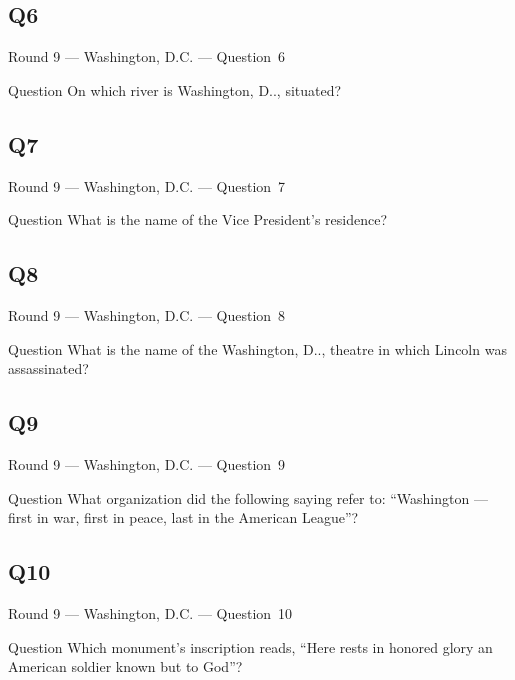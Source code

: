 \documentclass[11pt]{beamer}
\begin{document}
\subsection*{Q6}
\begin{frame}[t]{Round 9 --- Washington, D.C. --- \mbox{Question 6}}
\vspace{-0.5em}
\begin{block}{Question}
On which river is Washington, D.\@C.\@, situated?
\end{block}
\end{frame}
\subsection*{Q7}
\begin{frame}[t]{Round 9 --- Washington, D.C. --- \mbox{Question 7}}
\vspace{-0.5em}
\begin{block}{Question}
What is the name of the Vice President's residence?
\end{block}
\end{frame}
\subsection*{Q8}
\begin{frame}[t]{Round 9 --- Washington, D.C. --- \mbox{Question 8}}
\vspace{-0.5em}
\begin{block}{Question}
What is the name of the Washington, D.\@C.\@, theatre in which Lincoln was assassinated?
\end{block}
\end{frame}
\subsection*{Q9}
\begin{frame}[t]{Round 9 --- Washington, D.C. --- \mbox{Question 9}}
\vspace{-0.5em}
\begin{block}{Question}
What organization did the following saying refer to: ``Washington --- first in war, first in peace, last in the American League''?
\end{block}
\end{frame}
\subsection*{Q10}
\begin{frame}[t]{Round 9 --- Washington, D.C. --- \mbox{Question 10}}
\vspace{-0.5em}
\begin{block}{Question}
Which monument's inscription reads, ``Here rests in honored glory an American soldier known but to God''?
\end{block}
\end{frame}
\end{document}
